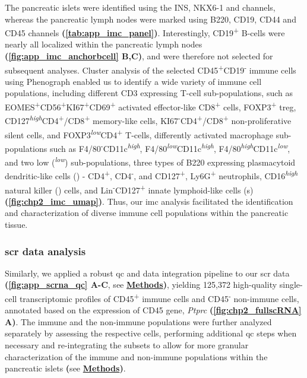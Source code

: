 \par The pancreatic islets were identified using the INS, NKX6-1 and  channels, whereas the pancreatic lymph nodes were marked using B220, CD19, CD44 and CD45 channels \textbf{(\autoref{tab:app_imc_panel})}. Interestingly, CD19\textsuperscript{+} B-cells were nearly all localized within the pancreatic lymph nodes \textbf{(\autoref{fig:app_imc_anchorbcell} B,C)}, and were therefore not selected for subsequent analyses. Cluster analysis of the selected CD45\textsuperscript{+}CD19\textsuperscript{-} immune cells using Phenograph enabled us to identify a wide variety of immune cell populations, including different CD3 expressing T-cell sub-populations, such as EOMES\textsuperscript{+}CD56\textsuperscript{+}KI67\textsuperscript{+}CD69\textsuperscript{+} activated effector-like CD8\textsuperscript{+} cells, FOXP3\textsuperscript{+} \gls{treg}, CD127\textsuperscript{\textit{high}}CD4\textsuperscript{+}/CD8\textsuperscript{+} memory-like cells, KI67\textsuperscript{-}CD4\textsuperscript{+}/CD8\textsuperscript{+} non-proliferative silent cells, and FOXP3\textsuperscript{\textit{low}}CD4\textsuperscript{+} T-cells, differently activated macrophage sub-populations such as F4/80\textsuperscript{-}CD11c\textsuperscript{\textit{high}}, F4/80\textsuperscript{\textit{low}}CD11c\textsuperscript{\textit{high}}, F4/80\textsuperscript{\textit{high}}CD11c\textsuperscript{\textit{low}}, and two  low (\textsuperscript{\textit{low}}) sub-populations, three types of B220 expressing plasmacytoid dendritic-like cells () - CD4\textsuperscript{+}, CD4\textsuperscript{-}, and CD127\textsuperscript{+}, Ly6G\textsuperscript{+} neutrophils, CD16\textsuperscript{\textit{high}} natural killer () cells, and Lin\textsuperscript{-}CD127\textsuperscript{+} innate lymphoid-like cells (s) \textbf{(\autoref{fig:chp2_imc_umap})}. Thus, our \gls{imc} analysis facilitated the identification and characterization of diverse immune cell populations within the pancreatic tissue.

\subsubsection{\large \gls{scr} data analysis}
\label{sec_chp2_scrna1}
Similarly, we applied a robust \gls{qc} and data integration pipeline to our \gls{scr} data \textbf{(\autoref{fig:app_scrna_qc} A-C}, see \hyperref[subsec:met_chp2_scrdataprocess]{\textbf{Methods}}\textbf{)}, yielding 125,372 high-quality single-cell transcriptomic profiles of CD45\textsuperscript{+} immune cells and CD45\textsuperscript{-} non-immune cells, annotated based on the expression of CD45 gene, \textit{Ptprc} \textbf{(\autoref{fig:chp2_fullscRNA} A)}. The immune and the non-immune populations were further analyzed separately by assessing the respective cells, performing additional \gls{qc} steps when necessary and re-integrating the subsets to allow for more granular characterization of the immune and non-immune populations within the pancreatic islets \textbf{(}see \hyperref[subsubsec:met_chp2_immuneendo]{\textbf{Methods}}\textbf{)}.

